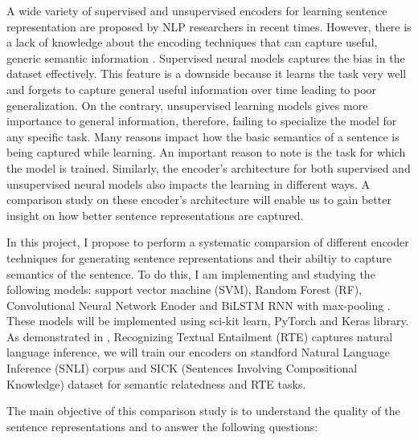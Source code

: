 \documentclass[12pt]{article} %
\begin{document}
A wide variety of supervised and unsupervised encoders  for learning sentence representation are proposed by NLP researchers in recent times. However, there is a lack of knowledge about the encoding techniques that can capture useful, generic semantic information \citep{conneau2017supervised}. Supervised neural models captures the bias in the dataset effectively. This feature is a downside because it learns the task very well and forgets to capture general useful information over time leading to poor generalization. On the contrary, unsupervised learning models gives more importance to general information, therefore, failing to specialize the model for any specific task. Many reasons impact how the basic semantics of a sentence is being captured while learning. An important reason to note is the task for which the model is trained. Similarly, the encoder's architecture for both supervised and unsupervised neural models also impacts the learning in different ways. A comparison study on these encoder's architecture will enable us to gain better insight on how better sentence representations are captured.


In this project, I propose to perform  a systematic comparsion of different encoder techniques for generating sentence representations and their abiltiy to capture semantics of the sentence. To do this, I am implementing and studying the following models: support vector machine (SVM), Random Forest (RF), Convolutional Neural Network Enoder \cite{shao2017hcti} and BiLSTM RNN with max-pooling \citep{conneau2017supervised}. These models will be implemented using sci-kit learn, PyTorch and Keras library. As demonstrated in \cite{conneau2017supervised}, Recognizing Textual Entailment (RTE) captures natural language inference, we will train our  encoders on standford Natural Language Inference (SNLI) corpus  \cite{bowman2015large} and SICK (Sentences Involving Compositional
Knowledge) dataset \cite{marelli2014semeval} for semantic relatedness and RTE tasks.

The main objective of this comparison study is to understand the quality of the sentence representations and to answer the following questions:
\end{document}
